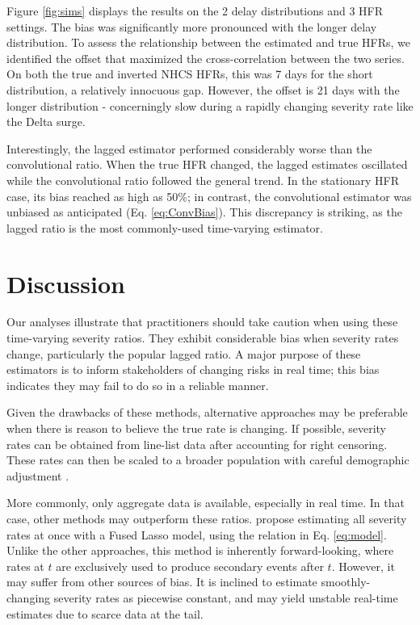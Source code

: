\documentclass{article}
\begin{document}
Figure \ref{fig:sims} displays the results on the 2 delay distributions and 3 HFR settings. The bias was significantly more pronounced with the longer delay distribution. To assess the relationship between the estimated and true HFRs, we identified the offset that maximized the cross-correlation between the two series. On both the true and inverted NHCS HFRs, this was 7 days for the short distribution, a relatively innocuous gap. However, the offset is 21 days with the longer distribution - concerningly slow during a rapidly changing severity rate like the Delta surge.

Interestingly, the lagged estimator performed considerably worse than the convolutional ratio. When the true HFR changed, the lagged estimates oscillated while the convolutional ratio followed the general trend. In the stationary HFR case, its bias reached as high as 50\%; in contrast, the convolutional estimator was unbiased as anticipated (Eq. \ref{eq:ConvBias}). This discrepancy is striking, as the lagged ratio is the most commonly-used time-varying estimator. 

\section{Discussion}

Our analyses illustrate that practitioners should take caution when using these time-varying severity ratios. They exhibit considerable bias when severity rates change, particularly the popular lagged ratio. A major purpose of these estimators is to inform stakeholders of changing risks in real time; this bias indicates they may fail to do so in a reliable manner.

Given the drawbacks of these methods, alternative approaches may be preferable when there is reason to believe the true rate is changing. If possible, severity rates can be obtained from line-list data after accounting for right censoring. These rates can then be scaled to a broader population with careful demographic adjustment \cite{verity2020estimates}. 

More commonly, only aggregate data is available, especially in real time. In that case, other methods may outperform these ratios. \citeauthor{fusedlasso} propose estimating all severity rates at once with a Fused Lasso model, using the relation in Eq. \ref{eq:model}. Unlike the other approaches, this method is inherently forward-looking, where rates at $t$ are exclusively used to produce secondary events after $t$. However, it may suffer from other sources of bias. It is inclined to estimate smoothly-changing severity rates as piecewise constant, and may yield unstable real-time estimates due to scarce data at the tail.
\end{document}
